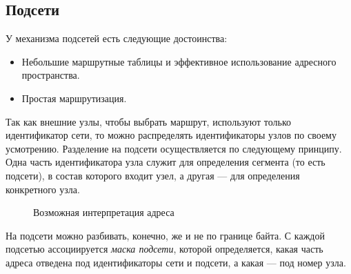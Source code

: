 \subsection{Подсети}
У механизма подсетей есть следующие достоинства:
\begin{itemize}
  \item Небольшие маршрутные таблицы и эффективное использование адресного пространства.
  \item Простая маршрутизация.
\end{itemize}

Так как внешние узлы, чтобы выбрать маршрут, используют только идентификатор сети, то можно распределять идентификаторы узлов по своему усмотрению. Разделение на подсети осуществляется по следующему принципу. Одна часть идентификатора узла служит для определения сегмента (то есть подсети), в состав которого входит узел, а другая --- для определения конкретного узла.

\noindent
\begin{figure}[h!]
  \centering
  \caption{Возможная интерпретация адреса}
\end{figure}

На подсети можно разбивать, конечно, же и не по границе байта. С каждой подсетью ассоциируется \emph{маска подсети}, которой определяется, какая часть адреса отведена под идентификаторы сети и подсети, а какая --- под номер узла.

